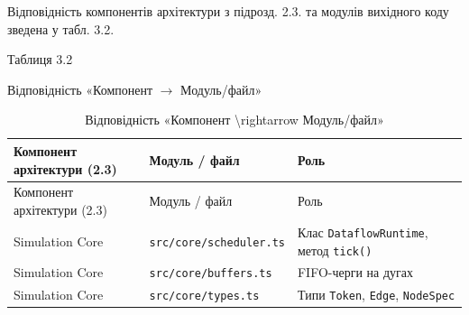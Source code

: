 \documentclass[
]{article}
\newcommand{\passthrough}[1]{#1}
\begin{document}
Відповідність компонентів архітектури з підрозд. 2.3. та модулів
вихідного коду зведена у табл. 3.2.

Таблиця 3.2

Відповідність «Компонент \(\mathbf{\rightarrow}\) Модуль/файл»

\begin{longtable}[]{@{}
  >{\raggedright\arraybackslash}p{}
  >{\raggedright\arraybackslash}p{}
  >{\raggedright\arraybackslash}p{}@{}}
\caption[Відповідність «Компонент \textbackslash rightarrow
Модуль/файл»]{Відповідність «Компонент \textbackslash rightarrow
Модуль/файл»}\tabularnewline
\toprule\noalign{}
\begin{minipage}[b]{\linewidth}\raggedright
Компонент архітектури (2.3)
\end{minipage} & \begin{minipage}[b]{\linewidth}\raggedright
Модуль / файл
\end{minipage} & \begin{minipage}[b]{\linewidth}\raggedright
Роль
\end{minipage} \\
\midrule\noalign{}
\endfirsthead
\toprule\noalign{}
\begin{minipage}[b]{\linewidth}\raggedright
Компонент архітектури (2.3)
\end{minipage} & \begin{minipage}[b]{\linewidth}\raggedright
Модуль / файл
\end{minipage} & \begin{minipage}[b]{\linewidth}\raggedright
Роль
\end{minipage} \\
\midrule\noalign{}
\endhead
\bottomrule\noalign{}
\endlastfoot
Simulation Core &
\passthrough{\lstinline!src!}\passthrough{\lstinline!/core/!}\passthrough{\lstinline!scheduler.ts!}
& Клас \passthrough{\lstinline!DataflowRuntime!}, метод
\passthrough{\lstinline!tick()!} \\
Simulation Core &
\passthrough{\lstinline!src!}\passthrough{\lstinline!/core/!}\passthrough{\lstinline!buffers.ts!}
& FIFO-черги на дугах \\
Simulation Core &
\passthrough{\lstinline!src!}\passthrough{\lstinline!/core/!}\passthrough{\lstinline!types.ts!}
& Типи \passthrough{\lstinline!Token!}, \passthrough{\lstinline!Edge!},
\passthrough{\lstinline!NodeSpec!} \\

\end{longtable}
\end{document}
